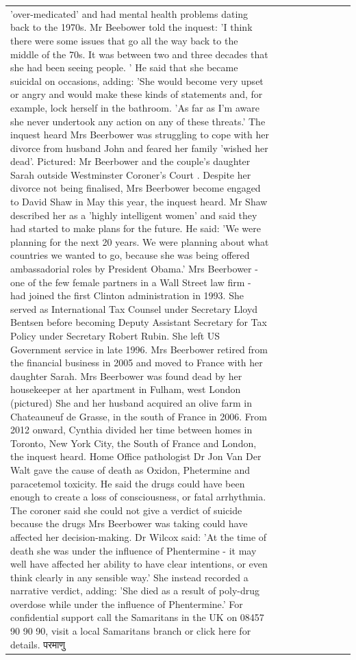 \begin{table}[H]
\begin{tabular}{lllrlllll}
'over-medicated' and had mental health problems dating back to the 1970s. Mr Beebower told the inquest: 'I think there were some issues that go all the way back to the middle of the 70s. It was between two and three decades that she had been seeing people. ' He said that she became suicidal on occasions, adding: 'She would become very upset or angry and would make these kinds of statements and, for example, lock herself in the bathroom. 'As far as I'm aware she never undertook any action on any of these threats.' The inquest heard Mrs Beerbower was struggling to cope with her divorce from husband John and feared her family 'wished her dead'. Pictured: Mr Beerbower and the couple's daughter Sarah outside Westminster Coroner's Court . Despite her divorce not being finalised, Mrs Beerbower become engaged to David Shaw in May this year, the inquest heard. Mr Shaw described her as a 'highly intelligent women' and said they had started to make plans for the future. He said: 'We were planning for the next 20 years. We were planning about what countries we wanted to go, because she was being offered ambassadorial roles by President Obama.' Mrs Beerbower - one of the few female partners in a Wall Street law firm - had joined the first Clinton administration in 1993. She served as International Tax Counsel under Secretary Lloyd Bentsen before becoming Deputy Assistant Secretary for Tax Policy under Secretary Robert Rubin. She left US Government service in late 1996. Mrs Beerbower retired from the financial business in 2005 and moved to France with her daughter Sarah. Mrs Beerbower was found dead by her housekeeper at her apartment in Fulham, west London (pictured) She and her husband acquired an olive farm in Chateauneuf de Grasse, in the south of France in 2006. From 2012 onward, Cynthia divided her time between homes in Toronto, New York City, the South of France and London, the inquest heard. Home Office pathologist Dr Jon Van Der Walt gave the cause of death as Oxidon, Phetermine and paracetemol toxicity. He said the drugs could have been enough to create a loss of consciousness, or fatal arrhythmia. The coroner said she could not give a verdict of suicide because the drugs Mrs Beerbower was taking could have affected her decision-making. Dr Wilcox said: 'At the time of death she was under the influence of Phentermine - it may well have affected her ability to have clear intentions, or even think clearly in any sensible way.' She instead recorded a narrative verdict, adding: 'She died as a result of poly-drug overdose while under the influence of Phentermine.' For confidential support call the Samaritans in the UK on 08457 90 90 90, visit a local Samaritans branch or click here for details. परमाणु \\

\end{tabular}
\end{table}
